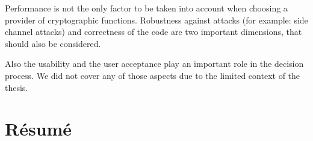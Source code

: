 Performance is not the only factor to be taken into account when choosing a provider of cryptographic functions.
Robustness against attacks (for example: side channel attacks) and correctness of the code are two important dimensions, that should also be considered.

Also the usability and the user acceptance play an important role in the decision process.
We did not cover any of those aspects due to the limited context of the thesis.

\section{Résumé}

